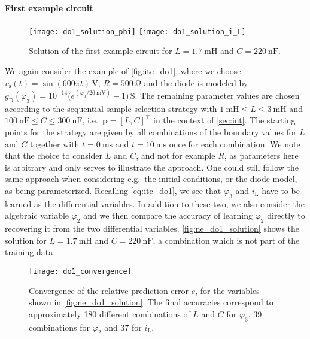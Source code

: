 \documentclass[AMA,STIX1COL]{WileyNJD-v2}
\newcommand{\mb}[1]{\mathbf{#1}}
\newcommand{\mr}[1]{\mathrm{#1}}
\newcommand{\T}{{\!\top}}
\begin{document}
\paragraph{First example circuit}
\begin{figure}[t]
    \begin{center}
        \texttt{[image: do1\_solution\_phi]} \hspace{1.5cm} \texttt{[image: do1\_solution\_i\_L]}
    \end{center}
    \caption{Solution of the first example circuit for $L = \SI{1.7}{\milli\henry}$ and $C = \SI{220}{\nano\farad}$.}
    \label{fig:ne_do1_solution}
\end{figure}
We again consider the example of \autoref{fig:itc_do1}, where we choose $v_\mr{s}(t) = \sin(600 \pi t)\, \si{\volt}$, $R = \SI{500}{\ohm}$ and the diode is modeled by $g_\mr{D}(\varphi_3) = 10^{-14} \big( e^{(\varphi_3 / \SI{26}{\mV})} - 1 \big)\, \si{\siemens}$. The remaining parameter values are chosen according to the sequential sample selection strategy with $\SI{1}{\milli\henry} \leq L \leq \SI{3}{\milli\henry}$ and $\SI{100}{\nano\farad} \leq C \leq \SI{300}{\nano\farad}$, i.e.~$\mb{p} = [L, C]^\T$ in the context of \autoref{sec:int}. The starting points for the strategy are given by all combinations of the boundary values for $L$ and $C$ together with $t = \SI{0}{\ms}$ and $t = \SI{10}{\ms}$ once for each combination. We note that the choice to consider $L$ and $C$, and not for example $R$, as parameters here is arbitrary and only serves to illustrate the approach. One could still follow the same approach when considering e.g.~the initial conditions, or the diode model, as being parameterized. Recalling \eqref{eq:itc_do1}, we see that $\varphi_3$ and $i_\mr{L}$ have to be learned as the differential variables. In addition to these two, we also consider the algebraic variable $\varphi_2$ and we then compare the accuracy of learning $\varphi_2$ directly to recovering it from the two differential variables. \autoref{fig:ne_do1_solution} shows the solution for $L = \SI{1.7}{\milli\henry}$ and $C = \SI{220}{\nano\farad}$, a combination which is not part of the training data.
\begin{figure}[b]
    \begin{center}
        \texttt{[image: do1\_convergence]}
    \end{center}
    \caption{Convergence of the relative prediction error $e$, for the variables shown in \autoref{fig:ne_do1_solution}. The final accuracies correspond to approximately 180 different combinations of $L$ and $C$ for $\varphi_3$, 39 combinations for $\varphi_2$ and 37 for $i_\mr{L}$.}
    \label{fig:ne_do1_convergence}
\end{figure}
\end{document}

